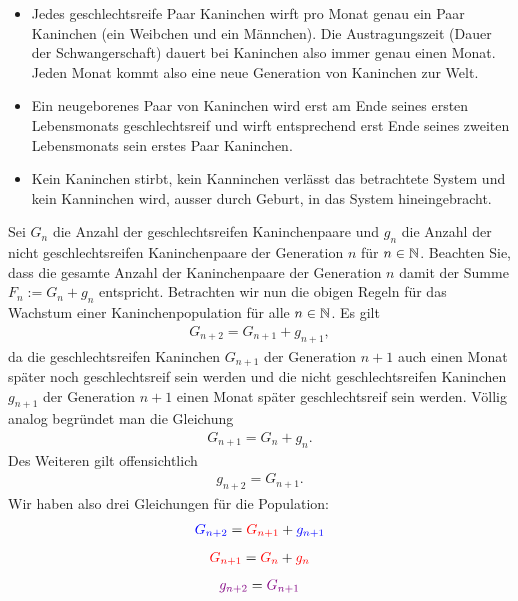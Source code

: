 \begin{itemize}
    \item Jedes geschlechtsreife Paar Kaninchen wirft pro Monat genau ein Paar Kaninchen (ein Weibchen und ein Männchen). Die Austragungszeit (Dauer der Schwangerschaft) dauert bei Kaninchen also immer genau einen Monat. Jeden Monat kommt also eine neue Generation von Kaninchen zur Welt.
    \item Ein neugeborenes Paar von Kaninchen wird erst am Ende seines ersten Lebensmonats geschlechtsreif und wirft entsprechend erst Ende seines zweiten Lebensmonats sein erstes Paar Kaninchen.
    \item Kein Kaninchen stirbt, kein Kanninchen verlässt das betrachtete System und kein Kanninchen wird, ausser durch Geburt, in das System hineingebracht.
\end{itemize}
Sei $G_n$ die Anzahl der geschlechtsreifen Kaninchenpaare und $g_n$ die Anzahl der nicht geschlechtsreifen Kaninchenpaare der Generation $n$ für $n\in\mathbb{N}$. Beachten Sie, dass die gesamte Anzahl der Kaninchenpaare der Generation $n$ damit der Summe $F_n := G_n+g_n$ entspricht. Betrachten wir nun die obigen Regeln für das Wachstum einer Kaninchenpopulation für alle $n\in\mathbb{N}$. Es gilt
\begin{align}
    G_{n+2} = G_{n+1} + g_{n+1},
\end{align}
da die geschlechtsreifen Kaninchen $G_{n+1}$ der Generation $n+1$ auch einen Monat später noch geschlechtsreif sein werden und die nicht geschlechtsreifen Kaninchen $g_{n+1}$ der Generation $n+1$ einen Monat später geschlechtsreif sein werden. Völlig analog begründet man die Gleichung
\begin{align}
    G_{n+1} = G_{n} + g_{n}.
\end{align}
Des Weiteren gilt offensichtlich
\begin{align}
    g_{n+2}  = G_{n+1}.
\end{align}
Wir haben also drei Gleichungen für die Population:
\begin{align}\label{eq:Fib1}
    \textcolor{Blue}{G_{n+2}} = \textcolor{Red}{G_{n+1}} +  \textcolor{Blue}{g_{n+1}}
\end{align}
\begin{align}\label{eq:Fib2}
    \textcolor{Red}{G_{n+1}} = \textcolor{Red}{G_{n}} + \textcolor{Red}{g_{n}}
\end{align}
\begin{align}\label{eq:Fib3}
    \textcolor{Purple}{g_{n+2}}  = \textcolor{Purple}{G_{n+1}}
\end{align}

